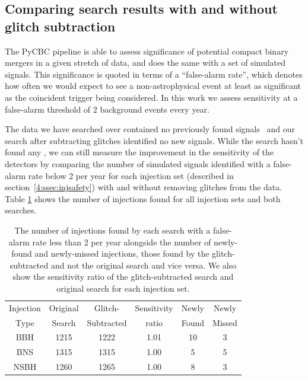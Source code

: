 \subsection{Comparing search results with and without glitch subtraction}

The PyCBC pipeline is able to assess significance of potential compact binary mergers in a given stretch of data, and does the same with a set of simulated signals. This significance is quoted in terms of a ``false-alarm rate'', which denotes how often we would expect to see a non-astrophysical event at least as significant as the coincident trigger being considered. In this work we assess sensitivity at a false-alarm threshold of 2 background events every year.

The data we have searched over contained no previously found \gw{} signals~\cite{gwtc3:2023} and our search after subtracting \scl{} glitches identified no new \gw{} signals. While the search hasn't found any \gws{}, we can still measure the improvement in the sensitivity of the detectors by comparing the number of simulated signals identified with a false-alarm rate below 2 per year for each injection set (described in section~\ref{4:ssec:injsafety}) with and without removing glitches from the data. Table \ref{4:tab:found_injs} shows the number of injections found for all injection sets and both searches.
%
\begin{table}[tb]
\centering
\caption{\label{4:tab:found_injs}The number of injections found by each search with a false-alarm rate less than 2 per year alongside the number of newly-found and newly-missed injections, those found by the glitch-subtracted and not the original search and vice versa. We also show the sensitivity ratio of the glitch-subtracted search and original search for each injection set.} 
\footnotesize
\renewcommand{\arraystretch}{1.2}
\begin{tabular}{@{}cccccc}
\hline
Injection & Original  & Glitch- & Sensitivity & Newly & Newly \\
Type & Search & Subtracted & ratio & Found & Missed \\
\hline
BBH & 1215 & 1222 & 1.01 & 10 & 3 \\
BNS & 1315 & 1315 & 1.00 & 5 & 5 \\
NSBH & 1260 & 1265 & 1.00 & 8 & 3 \\
\hline
\end{tabular}


\end{table}

